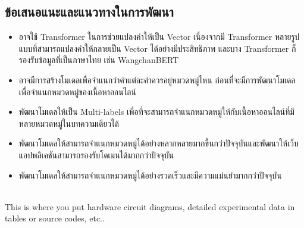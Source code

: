 \documentclass[12pt,oneside,openright,a4paper]{cpe-thai-project}
\begin{document}
\begin{itemize}
\begin{enumerate}
  \subsection{ข้อเสนอแนะและแนวทางในการพัฒนา}
    \begin{itemize}
      \item อาจใช้ Transformer ในการช่วยแปลงคำให้เป็น Vector เนื่องจากมี Transformer หลายรูปแบบที่สามารถแปลงคำให้กลายเป็น Vector ได้อย่างมีประสิทธิภาพ
            และบาง Transformer ก็รองรับข้อมูลที่เป็นภาษาไทย เช่น WangchanBERT
      \item อาจมีการสร้างโมเดลเพื่อจำแนกว่าคำแต่ละคำควรอยู่หมวดหมู่ไหน ก่อนที่จะมีการพัฒนาโมเดลเพื่อจำแนกหมวดหมู่ของเนื้อหาออนไลน์
      \item พัฒนาโมเดลให้เป็น Multi-labels เพื่อที่จะสามารถจำแนกหมวดหมู่ให้กับเนื้อหาออนไลน์ที่มีหลายหมวดหมู่ในบทความเดียวได้
      \item พัฒนาโมเดลให้สามารถจำแนกหมวดหมู่ได้อย่างหลากหลายมากขึ้นกว่าปัจจุบันและพัฒนาให้เว็บแอปพลิเคชันสามารถรองรับโดเมนได้มากกว่าปัจจุบัน
      \item พัฒนาโมเดลให้สามารถจำแนกหมวดหมู่ได้อย่างรวดเร็วและมีความแม่นยำมากกว่าปัจจุบัน
    \end{itemize}




\makeatletter
\g@addto@macro{\UrlBreaks}{\UrlOrds}
\makeatother




 \\

This is where you put hardware circuit diagrams, detailed experimental data in tables or source codes, etc.. \\ \bigskip




\end{enumerate}
\end{itemize}
\end{document}

